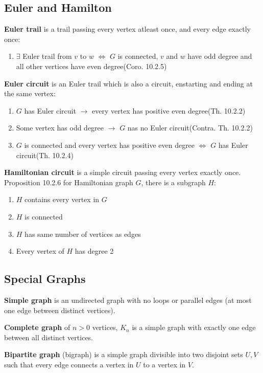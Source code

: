 \documentclass[12pt, a4paper]{article}
\begin{document}
\begin{multicols*}{3}
\subsection{Euler and Hamilton}
\textbf{Euler trail} is a trail passing every vertex atleast once, and every edge exactly once:
\begin{enumerate}[label=\roman*.]
  \item $\exists$ Euler trail from $v$ to $w$ $\iff$ $G$ is connected, $v$ and $w$ have odd degree and all other vertices have even degree\hfill(Coro. 10.2.5)
\end{enumerate}
\textbf{Euler circuit} is an Euler trail which is also a circuit, enstarting and ending at the same vertex:
\begin{enumerate}[label=\roman*.]
  \item $G$ has Euler circuit $\rightarrow$ every vertex has positive even degree\hfill(Th. 10.2.2)
  \item Some vertex has odd degree $\rightarrow$ $G$ nas no Euler circuit\hfill(Contra. Th. 10.2.2)
  \item $G$ is connected and every vertex has positive even degree $\iff$ $G$ has Euler circuit\hfill(Th. 10.2.4)
\end{enumerate}
\textbf{Hamiltonian circuit} is a simple circuit passing every vertex exactly once.\\
Proposition 10.2.6 for Hamiltonian graph $G$, there is a subgraph $H$:
\begin{enumerate}[\roman*.]
  \item $H$ contains every vertex in $G$
  \item $H$ is connected
  \item $H$ has same number of vertices as edges
  \item Every vertex of $H$ has degree 2
\end{enumerate}

\colbreak
\subsection{Special Graphs}
\textbf{Simple graph} is an undirected graph with no loops or parallel edges (at most one edge between distinct vertices).

\textbf{Complete graph} of $n > 0$ vertices, $K_n$ is a simple graph with exactly one edge between all distinct vertices.

\textbf{Bipartite graph} (bigraph) is a simple graph divisible into two disjoint sets $U, V$ such that every edge connects a vertex in $U$ to a vertex in $V$.


\end{multicols*}
\end{document}
